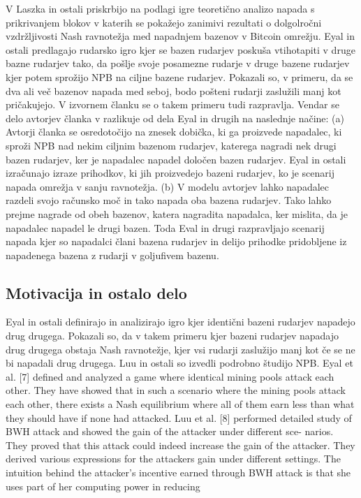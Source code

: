 \documentclass[12pt]{article}
\begin{document}
V \cite{financialcryptography} Laszka in ostali priskrbijo na podlagi igre teoretično analizo napada s prikrivanjem blokov v katerih se pokažejo zanimivi rezultati o dolgolročni vzdržljivosti Nash ravnotežja med napadnjem bazenov v Bitcoin omrežju. Eyal in ostali \cite{minnersdilemma} predlagajo rudarsko igro kjer se bazen rudarjev poskuša vtihotapiti v druge bazne rudarjev tako, da pošlje svoje posamezne rudarje v druge bazene rudarjev kjer potem sprožijo NPB na ciljne bazene rudarjev. Pokazali so, v primeru, da se dva ali več bazenov napada med seboj, bodo pošteni rudarji zaslužili manj kot pričakujejo. V izvornem članku se o takem primeru tudi razpravlja. Vendar se delo avtorjev članka v \cite{originalarticle} razlikuje od dela Eyal in drugih \cite{minnersdilemma} na naslednje načine: (a) Avtorji članka se osredotočijo na znesek dobička, ki ga proizvede napadalec, ki sproži NPB nad nekim ciljnim bazenom rudarjev, katerega nagradi nek drugi bazen rudarjev, ker je napadalec napadel določen bazen rudarjev. Eyal in ostali izračunajo izraze prihodkov, ki jih proizvedejo bazeni rudarjev, ko je scenarij napada omrežja v sanju ravnotežja. (b) V modelu avtorjev \cite{originalarticle} lahko napadalec razdeli svojo računsko moč in tako napada oba bazena rudarjev. Tako lahko prejme nagrade od obeh bazenov, katera nagradita napadalca, ker mislita, da je napadalec napadel le drugi bazen. Toda Eval in drugi razpravljajo scenarij napada kjer so napadalci člani bazena rudarjev in delijo prihodke pridobljene iz napadenega bazena z rudarji v goljufivem bazenu.

\subsection{Motivacija in ostalo delo}

Eyal \cite{minnersdilemma} in ostali definirajo in analizirajo igro kjer identični bazeni rudarjev napadejo drug drugega. Pokazali so, da v takem primeru kjer bazeni rudarjev napadajo drug drugega obstaja Nash ravnotežje, kjer vsi rudarji zaslužijo manj kot če se ne bi napadali drug drugega. Luu in ostali \cite{powersplitting} so izvedli podrobno študijo NPB.
Eyal et al. [7] defined and analyzed a game where identical mining pools attack each other. They have showed that in such a scenario where the mining pools attack each other, there exists a Nash equilibrium where all of them earn less than what they should have if none had attacked.
Luu et al. [8] performed detailed study of BWH attack and showed the gain of the attacker under different sce- narios. They proved that this attack could indeed increase the gain of the attacker. They derived various expressions for the attackers gain under different settings. The intuition behind the attacker’s incentive earned through BWH attack
is that she uses part of her computing power in reducing
\newpage
\end{document}
